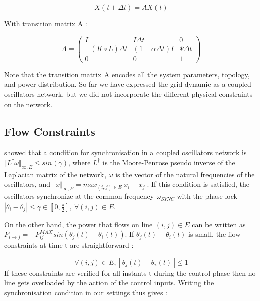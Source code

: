 \documentclass[conference]{IEEEtran}
\begin{document}
\begin{equation}
\label{eq:final_equation}
 X(t+\Delta t) = A X(t)
\end{equation}

\noindent With transition matrix A :

\begin{equation}
 A =   \left( \begin{array}{ccc} I & I \Delta t & 0 \\ -(K \circ L) \Delta t & (1-\alpha \Delta t)I & \Psi \Delta t \\ 0&0&1 \end{array} \right)
\end{equation}

Note that the transition matrix A encodes all the system parameters, topology, and power distribution. So far we have expressed the grid dynamic as a coupled oscillators network, but we did not incorporate the different physical constraints on the network.

\subsection{Flow Constraints}

\cite{Dorfler2013} showed that a condition for synchronisation in a coupled oscillators network is $ \Vert L^{\dagger}\omega \Vert_{\infty,E} \leq sin(\gamma) $, where $ L^{\dagger}$ is the Moore-Penrose pseudo inverse of the Laplacian matrix of the network, $ \omega $ is the vector of the natural frequencies of the oscillators, and $ \Vert x \Vert_{\infty,E} = max_{(i,j) \in E} \left| x_i - x_j \right| $. If this condition is satisfied, the oscillators synchronize at the common frequency $ \omega_{SYNC} $ with the phase lock $ \left| \theta_i - \theta_j \right| \leq    \gamma \in[0,\frac{\pi}{2}],\ \forall (i,j) \in E $.

On the other hand, the power that flows on line $ (i,j) \in E$ can be written as $ P_{i \longrightarrow j} = -P_{ij}^{MAX} sin\left( \theta_j(t) - \theta_i(t) \right) $. If $ \theta_j(t) - \theta_i(t) $ is small, the flow constraints at time t are straightforward :

\begin{equation}
\label{eq:flow_cons}
\forall (i,j) \in E,\ \left|\ \theta_j(t) - \theta_i(t)\ \right| \leq 1
\end{equation}
If these constraints are verified for all instants t during the control phase then no line gets overloaded by the action of the control inputs. Writing the synchronisation condition in our settings thus gives :
\end{document}
